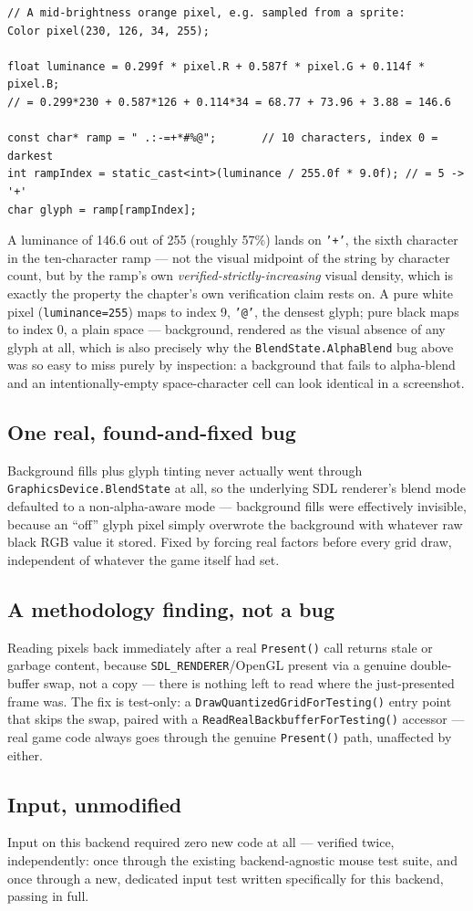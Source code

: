 \begin{lstlisting}
// A mid-brightness orange pixel, e.g. sampled from a sprite:
Color pixel(230, 126, 34, 255);

float luminance = 0.299f * pixel.R + 0.587f * pixel.G + 0.114f * pixel.B;
// = 0.299*230 + 0.587*126 + 0.114*34 = 68.77 + 73.96 + 3.88 = 146.6

const char* ramp = " .:-=+*#%@";       // 10 characters, index 0 = darkest
int rampIndex = static_cast<int>(luminance / 255.0f * 9.0f); // = 5 -> '+'
char glyph = ramp[rampIndex];
\end{lstlisting}

A luminance of 146.6 out of 255 (roughly 57\%) lands on \texttt{'+'}, the sixth character in
the ten-character ramp --- not the visual midpoint of the string by character count, but by
the ramp's own \emph{verified-strictly-increasing} visual density, which is exactly the
property the chapter's own verification claim rests on. A pure white pixel
(\texttt{luminance=255}) maps to index 9, \texttt{'@'}, the densest glyph; pure black maps to
index 0, a plain space --- background, rendered as the visual absence of any glyph at all,
which is also precisely why the \texttt{BlendState.AlphaBlend} bug above was so easy to miss
purely by inspection: a background that fails to alpha-blend and an intentionally-empty
space-character cell can look identical in a screenshot.

\subsection{One real, found-and-fixed bug}

Background fills plus glyph tinting never actually went through
\texttt{GraphicsDevice.BlendState} at all, so the underlying SDL renderer's blend mode
defaulted to a non-alpha-aware mode --- background fills were effectively invisible, because
an ``off'' glyph pixel simply overwrote the background with whatever raw black RGB value it
stored. Fixed by forcing real  factors before every grid draw,
independent of whatever  the game itself had set.

\subsection{A methodology finding, not a bug}

Reading pixels back immediately after a real \texttt{Present()} call returns stale or
garbage content, because \texttt{SDL\_RENDERER}/OpenGL present via a genuine double-buffer
swap, not a copy --- there is nothing left to read where the just-presented frame was. The
fix is test-only: a \texttt{DrawQuantizedGridForTesting()} entry point that skips the swap,
paired with a \texttt{Read\allowbreak{}RealBackbuffer\allowbreak{}ForTesting()} accessor --- real game code always goes
through the genuine \texttt{Present()} path, unaffected by either.

\subsection{Input, unmodified}

Input on this backend required zero new code at all --- verified twice, independently: once
through the existing backend-agnostic mouse test suite, and once through a new, dedicated
input test written specifically for this backend, passing in full.
